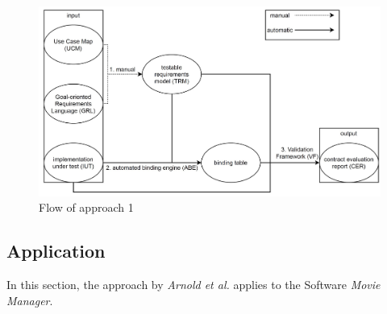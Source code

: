 \begin{figure}[h]
	\centering
	\includegraphics[scale=0.4]{../images/08/08_controllFlow1.jpg} 
	\caption{Flow of approach 1}
	\label{fig:08_flowOf1}
\end{figure}

\subsection{Application}
In this section, the approach by \textit{Arnold et al.} applies to the Software \textit{Movie Manager}.
